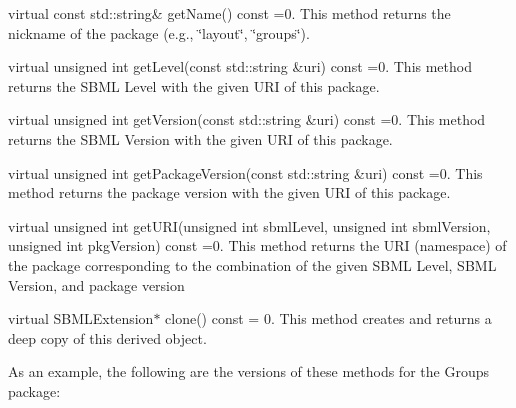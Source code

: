 \begin{DoxyItemize}
\item {\ttfamily virtual const std\+::string\& get\+Name() const =0}. This method returns the nickname of the package (e.\+g., \char`\"{}layout\char`\"{}, \char`\"{}groups\char`\"{}).\end{DoxyItemize}
\begin{DoxyItemize}
\item {\ttfamily virtual unsigned int get\+Level(const std\+::string \&uri) const =0}. This method returns the S\+B\+ML Level with the given U\+RI of this package.\end{DoxyItemize}
\begin{DoxyItemize}
\item {\ttfamily virtual unsigned int get\+Version(const std\+::string \&uri) const =0}. This method returns the S\+B\+ML Version with the given U\+RI of this package.\end{DoxyItemize}
\begin{DoxyItemize}
\item {\ttfamily virtual unsigned int get\+Package\+Version(const std\+::string \&uri) const =0}. This method returns the package version with the given U\+RI of this package.\end{DoxyItemize}
\begin{DoxyItemize}
\item {\ttfamily virtual unsigned int get\+U\+RI(unsigned int sbml\+Level, unsigned int sbml\+Version, unsigned int pkg\+Version) const =0}. This method returns the U\+RI (namespace) of the package corresponding to the combination of the given S\+B\+ML Level, S\+B\+ML Version, and package version\end{DoxyItemize}
\begin{DoxyItemize}
\item {\ttfamily virtual S\+B\+M\+L\+Extension$\ast$ clone() const = 0}. This method creates and returns a deep copy of this derived object.\end{DoxyItemize}
As an example, the following are the versions of these methods for the Groups package\+: 
